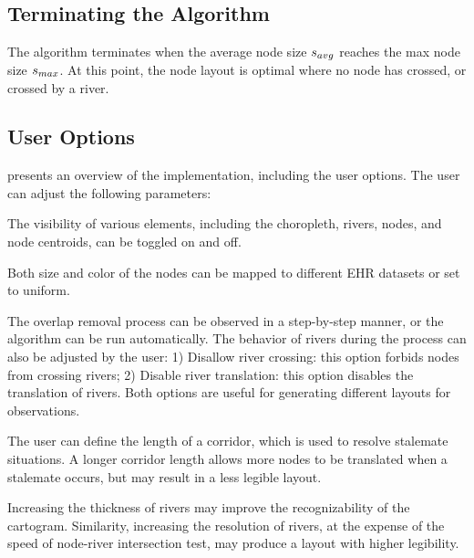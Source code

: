
\subsection{Terminating the Algorithm}

The algorithm terminates when the average node size $ s_{avg} $ reaches the max node size $ s_{max} $. At this point, the node layout is optimal where no node has crossed, or crossed by a river.

\subsection{User Options}

 presents an overview of the implementation, including the user options. The user can adjust the following parameters:

 The visibility of various elements, including the choropleth, rivers, nodes, and node centroids, can be toggled on and off.

 Both size and color of the nodes can be mapped to different EHR datasets or set to uniform.

 The overlap removal process can be observed in a step-by-step manner, or the algorithm can be run automatically. The behavior of rivers during the process can also be adjusted by the user: 1) Disallow river crossing: this option forbids nodes from crossing rivers; 2) Disable river translation: this option disables the translation of rivers. Both options are useful for generating different layouts for observations.

 The user can define the length of a corridor, which is used to resolve stalemate situations. A longer corridor length allows more nodes to be translated when a stalemate occurs, but may result in a less legible layout.

 Increasing the thickness of rivers may improve the recognizability of the cartogram. Similarity, increasing the resolution of rivers, at the expense of the speed of node-river intersection test, may produce a layout with higher legibility.


